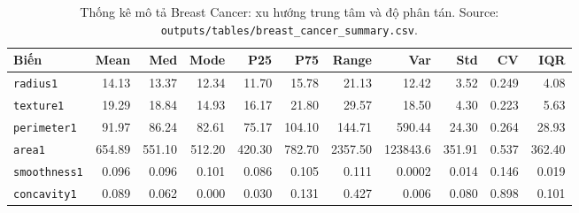 \begin{table}[H]
\centering
\caption[Thống kê mô tả Breast Cancer]{Thống kê mô tả Breast Cancer: xu hướng trung tâm và độ phân tán. Source: \texttt{outputs/tables/breast\_cancer\_summary.csv}.}
\label{tab:ch4_breast_stats}
\scriptsize
\setlength{\tabcolsep}{3pt}
\begin{tabular}{lrrrrrrrrrr}
\toprule
Biến & Mean & Med & Mode & P25 & P75 & Range & Var & Std & CV & IQR \\
\midrule
\texttt{radius1} & 14.13 & 13.37 & 12.34 & 11.70 & 15.78 & 21.13 & 12.42 & 3.52 & 0.249 & 4.08 \\
\texttt{texture1} & 19.29 & 18.84 & 14.93 & 16.17 & 21.80 & 29.57 & 18.50 & 4.30 & 0.223 & 5.63 \\
\texttt{perimeter1} & 91.97 & 86.24 & 82.61 & 75.17 & 104.10 & 144.71 & 590.44 & 24.30 & 0.264 & 28.93 \\
\texttt{area1} & 654.89 & 551.10 & 512.20 & 420.30 & 782.70 & 2357.50 & 123843.6 & 351.91 & 0.537 & 362.40 \\
\texttt{smoothness1} & 0.096 & 0.096 & 0.101 & 0.086 & 0.105 & 0.111 & 0.0002 & 0.014 & 0.146 & 0.019 \\
\texttt{concavity1} & 0.089 & 0.062 & 0.000 & 0.030 & 0.131 & 0.427 & 0.006 & 0.080 & 0.898 & 0.101 \\
\bottomrule
\end{tabular}
\end{table}

